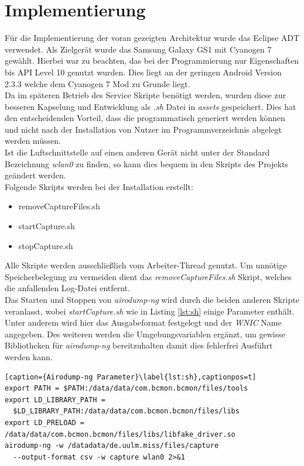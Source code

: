 \documentclass[]{report}
\begin{document}
\section{Implementierung}
Für die Implementierung der voran gezeigten Architektur wurde das Eclipse ADT\cite{ADT} verwendet. Als Zielgerät wurde das Samsung Galaxy GS1\cite{S1} mit Cyanogen 7 gewählt. Hierbei war zu beachten, das bei der Programmierung nur Eigenschaften bis API Level 10 genutzt wurden. Dies liegt an der geringen Android Version 2.3.3 welche dem Cyanogen 7 Mod zu Grunde liegt. \\
Da im späteren Betrieb des Service Skripte benötigt werden, wurden diese zur besseren Kapselung und Entwicklung als \textit{.sh} Datei in \textit{assets} gespeichert. Dies hat den entscheidenden Vorteil, dass die programmatisch generiert werden können und nicht nach der Installation von Nutzer im Programmverzeichnis abgelegt werden müssen.\\ Ist die Luftschnittstelle auf einen anderen Gerät nicht unter der Standard Bezeichnung \textit{wlan0} zu finden, so kann dies bequem in den Skripts des Projekts geändert werden. \\ 
Folgende Skripts werden bei der Installation erstellt:
\begin{itemize}
\item removeCaptureFiles.sh
\item startCapture.sh
\item stopCapture.sh
\end{itemize}
Alle Skripte werden ausschließlich vom Arbeiter-Thread genutzt. Um unnötige Speicherbelegung zu vermeiden dient das \textit{removeCaptureFiles.sh} Skript, welches die anfallenden Log-Datei entfernt. \\ Das Starten und Stoppen von \textit{airodump-ng} wird durch die beiden anderen Skripte veranlasst, wobei \textit{startCapture.sh} wie in Listing \ref{lst:sh} einige Parameter enthält. Unter anderem wird hier das Ausgabeformat festgelegt und der \textit{WNIC} Name angegeben. Des weiteren werden die Umgebungsvariablen ergänzt, um gewisse Bibliotheken für \textit{airodump-ng} bereitzuhalten damit dies fehlerfrei Ausführt werden kann.
\begin{lstlisting}[caption={Airodump-ng Parameter}\label{lst:sh},captionpos=t] 
export PATH = $PATH:/data/data/com.bcmon.bcmon/files/tools
export LD_LIBRARY_PATH = 
  $LD_LIBRARY_PATH:/data/data/com.bcmon.bcmon/files/libs
export LD_PRELOAD = /data/data/com.bcmon.bcmon/files/libs/libfake_driver.so
airodump-ng -w /datadata/de.uulm.miss/files/capture 
  --output-format csv -w capture wlan0 2>&1
 \end{lstlisting}
\end{document}

